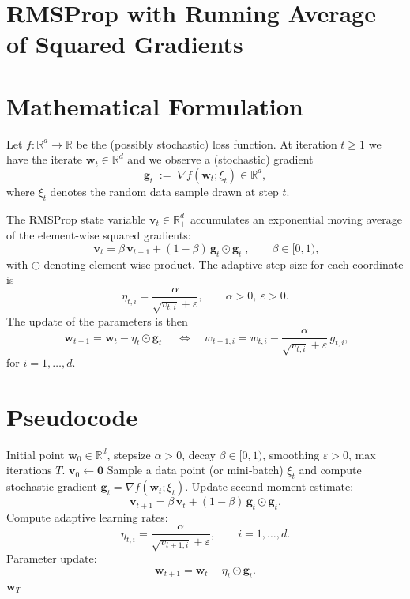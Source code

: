 \documentclass{article}
\newcommand{\R}{\mathbb{R}}
\begin{document}
\section*{RMSProp with Running Average of Squared Gradients}

\section*{Mathematical Formulation}
Let $f:\R^{d}\rightarrow\R$ be the (possibly stochastic) loss function.  
At iteration $t\ge 1$ we have the iterate $\mathbf w_{t}\in\R^{d}$ and we observe a (stochastic) gradient
\[
\mathbf g_{t}\;:=\;\nabla f(\mathbf w_{t};\xi_{t})\in\R^{d},
\]
where $\xi_{t}$ denotes the random data sample drawn at step $t$.

The RMSProp state variable $\mathbf v_{t}\in\R^{d}_{+}$ accumulates an exponential moving average of the element‑wise squared gradients:
\[
\boxed{\;\mathbf v_{t}= \beta\,\mathbf v_{t-1}+(1-\beta)\,\mathbf g_{t}\odot \mathbf g_{t}\;},
\qquad \beta\in[0,1),
\tag{1}
\]
with $\odot$ denoting element‑wise product.  
The adaptive step size for each coordinate is
\[
\eta_{t,i}= \frac{\alpha}{\sqrt{v_{t,i}}+\varepsilon},
\qquad \alpha>0,\ \varepsilon>0.
\tag{2}
\]
The update of the parameters is then
\[
\boxed{\;\mathbf w_{t+1}= \mathbf w_{t}-\eta_{t}\odot \mathbf g_{t}\;}
\quad\Longleftrightarrow\quad
w_{t+1,i}=w_{t,i}-\frac{\alpha}{\sqrt{v_{t,i}}+\varepsilon}\,g_{t,i},
\tag{3}
\]
for $i=1,\dots,d$.

\section*{Pseudocode}
\begin{algorithm}[H]
\caption{RMSProp (non‑convex smooth case)}\label{alg:rmsprop}
\begin{algorithmic}[1]
\Require Initial point $\mathbf w_{0}\in\R^{d}$, stepsize $\alpha>0$, decay $\beta\in[0,1)$, 
        smoothing $\varepsilon>0$, max iterations $T$.
\State $\mathbf v_{0}\gets \mathbf 0$ 
    \State Sample a data point (or mini‑batch) $\xi_{t}$ and compute stochastic gradient 
          $\mathbf g_{t}= \nabla f(\mathbf w_{t};\xi_{t})$.
    \State Update second‑moment estimate:
          \[
          \mathbf v_{t+1}= \beta\,\mathbf v_{t}+(1-\beta)\,\mathbf g_{t}\odot\mathbf g_{t}.
          \]
    \State Compute adaptive learning rates:
          \[
          \eta_{t,i}= \frac{\alpha}{\sqrt{v_{t+1,i}}+\varepsilon},\qquad i=1,\dots,d.
          \]
    \State Parameter update:
          \[
          \mathbf w_{t+1}= \mathbf w_{t}-\eta_{t}\odot\mathbf g_{t}.
          \]
\EndFor
\State \Return $\mathbf w_{T}$
\end{algorithmic}
\end{algorithm}
\end{document}
